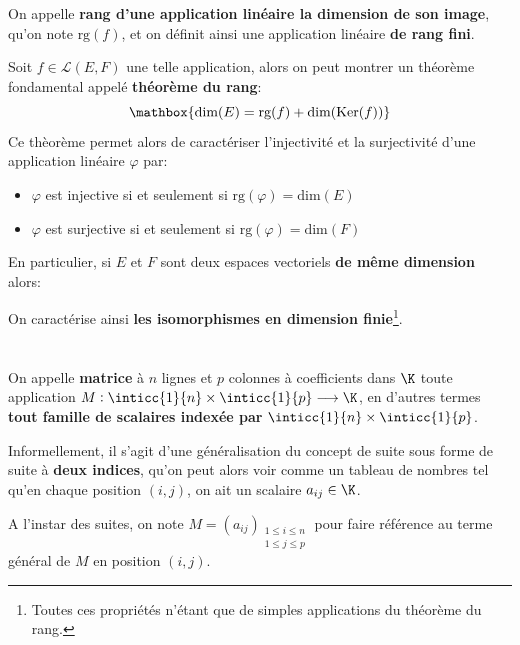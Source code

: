 \subsection*{}
On appelle \textbf{rang d'une application linéaire la dimension de son image}, qu'on note \(\text{rg}(f)\), et on définit ainsi une application linéaire \textbf{de rang fini}.\<

Soit \(f \in \mathcal{L}(E, F)\) une telle application, alors on peut montrer un théorème fondamental appelé \textbf{théorème du rang}:
\[
   \mathbox{\text{dim}(E) = \text{rg}(f) + \text{dim}(\text{Ker}(f))}
\]
Ce thèorème permet alors de caractériser l'injectivité et la surjectivité d'une application linéaire \(\varphi\) par:
\begin{itemize}
   \item \(\varphi\) est injective si et seulement si \(\text{rg}(\varphi) = \text{dim}(E)\)
   \item \(\varphi\) est surjective si et seulement si \(\text{rg}(\varphi) = \text{dim}(F)\)
\end{itemize}

En particulier, si \(E\) et \(F\) sont deux espaces vectoriels \textbf{de même dimension} alors:
\begin{center}
\end{center}
On caractérise ainsi \textbf{les isomorphismes en dimension finie}\footnote[2]{Toutes ces propriétés n'étant que de simples applications du théorème du rang.}.

\chapter*{}
On appelle \textbf{matrice} à \(n\) lignes et \(p\) colonnes à coefficients dans \(\K\) toute application \(M : \inticc{1}{n} \times \inticc{1}{p} \longrightarrow \K\), en d'autres termes \textbf{tout famille de scalaires indexée par }\(\inticc{1}{n} \times \inticc{1}{p}\).\<

Informellement, il s'agit d'une généralisation du concept de suite sous forme de suite à \textbf{deux indices}, qu'on peut alors voir comme un tableau de nombres tel qu'en chaque position \((i, j)\), on ait un scalaire \(a_{ij} \in \K\).\< 

A l'instar des suites, on note \(M = (a_{ij})_{\substack{1 \leq i \leq n\\1 \leq j \leq p}}\) pour faire référence au terme général de \(M\) en position \((i,j)\).

